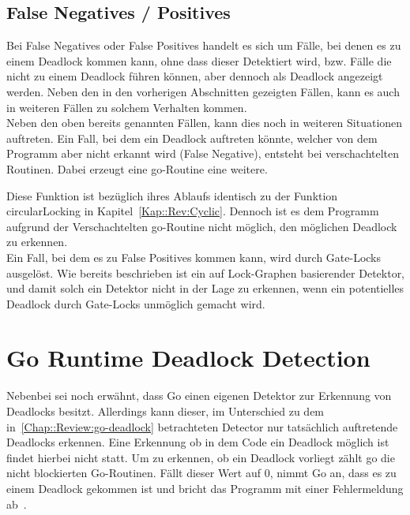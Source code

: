 \subsection{False Negatives / Positives} \label{Kap::Rev:False}
Bei False Negatives oder False Positives handelt es sich um Fälle, bei denen es 
zu einem Deadlock kommen kann, ohne dass dieser Detektiert wird, bzw. Fälle die
nicht zu einem 
Deadlock führen können, aber dennoch als Deadlock angezeigt werden. 
Neben den in den vorherigen Abschnitten gezeigten Fällen, kann es auch in weiteren 
Fällen zu solchem Verhalten kommen.\\
Neben den oben bereits genannten Fällen, kann dies noch in weiteren Situationen
auftreten.
Ein Fall,
bei dem ein Deadlock auftreten könnte, welcher von dem Programm aber nicht erkannt
wird (False Negative), entsteht bei verschachtelten Routinen. Dabei erzeugt eine go-Routine eine 
weitere.
\begin{figure}[H]
    
\end{figure}
Diese Funktion ist bezüglich ihres Ablaufs identisch zu der Funktion 
circularLocking in Kapitel~\ref*{Kap::Rev:Cyclic}. Dennoch ist es dem 
Programm aufgrund der Verschachtelten go-Routine nicht möglich, den möglichen 
Deadlock zu erkennen. \\
Ein Fall, bei dem es zu False Positives kommen kann, wird durch Gate-Locks
ausgelöst. Wie bereits beschrieben ist ein auf Lock-Graphen basierender Detektor,
und damit solch ein Detektor nicht in der Lage zu erkennen, wenn ein 
potentielles Deadlock durch Gate-Locks unmöglich gemacht wird.

\section{Go Runtime Deadlock Detection}
Nebenbei sei noch erwähnt, dass Go einen eigenen Detektor zur Erkennung von Deadlocks
besitzt. Allerdings kann 
dieser, im Unterschied zu dem in~\ref{Chap::Review:go-deadlock} betrachteten 
Detector nur tatsächlich auftretende Deadlocks erkennen. Eine Erkennung ob 
in dem Code ein Deadlock möglich ist findet hierbei nicht statt. Um zu erkennen,
ob ein Deadlock vorliegt zählt go die nicht blockierten Go-Routinen.
Fällt dieser Wert auf $0$, nimmt Go an, dass es zu einem Deadlock gekommen 
ist und bricht das Programm mit einer Fehlermeldung ab~\cite{grdd_code}.
